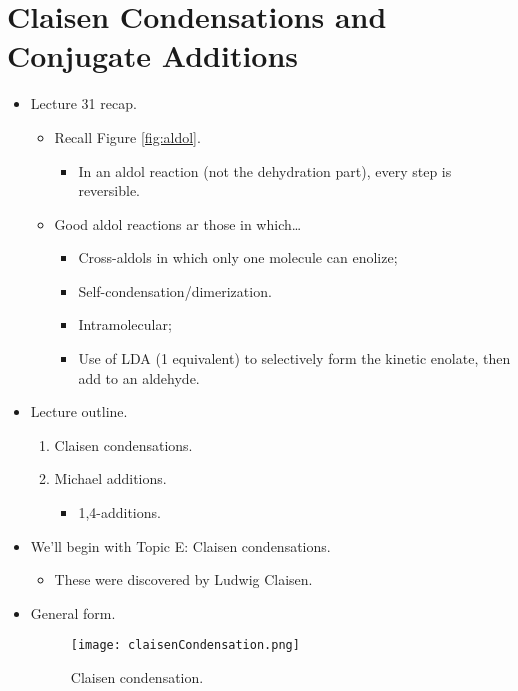 \documentclass[../notes.tex]{subfiles}
\begin{document}
\section{Claisen Condensations and Conjugate Additions}
\begin{itemize}
    \item {}Lecture 31 recap.
    \begin{itemize}
        \item Recall Figure \ref{fig:aldol}.
        \begin{itemize}
            \item In an aldol reaction (not the dehydration part), every step is reversible.
        \end{itemize}
        \item Good aldol reactions ar those in which\dots
        \begin{itemize}
            \item Cross-aldols in which only one molecule can enolize;
            \item Self-condensation/dimerization.
            \item Intramolecular;
            \item Use of LDA (1 equivalent) to selectively form the kinetic enolate, then add to an aldehyde.
        \end{itemize}
    \end{itemize}
    \item Lecture outline.
    \begin{enumerate}[label={\Alph*.},start=5]
        \item Claisen condensations.
        \item Michael additions.
        \begin{itemize}
            \item 1,4-additions.
        \end{itemize}
    \end{enumerate}
    \item We'll begin with Topic E: Claisen condensations.
    \begin{itemize}
        \item These were discovered by Ludwig Claisen.
    \end{itemize}
    \item General form.
    \begin{figure}[h!]
        \centering
        \texttt{[image: claisenCondensation.png]}
        \caption{Claisen condensation.}

\end{figure}
\end{itemize}
\end{document}
